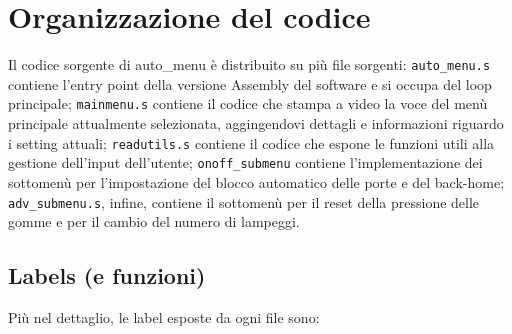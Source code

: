\documentclass[
  12pt,
  a4paper,
  headings=optiontoheadandtoc
]{scrreprt}
\begin{document}
\chapter[nonumber=true]{Organizzazione del codice}

Il codice sorgente di auto\_menu è distribuito su più file sorgenti: \texttt{auto\_menu.s} contiene l'entry point della versione Assembly del software e si occupa del loop principale; \texttt{mainmenu.s} contiene il codice che stampa a video la voce del menù principale attualmente selezionata, aggingendovi dettagli e informazioni riguardo i setting attuali; \texttt{readutils.s} contiene il codice che espone le funzioni utili alla gestione dell'input dell'utente; \texttt{onoff\_submenu} contiene l'implementazione dei sottomenù per l'impostazione del blocco automatico delle porte e del back-home; \texttt{adv\_submenu.s}, infine, contiene il sottomenù per il reset della pressione delle gomme e per il cambio del numero di lampeggi.

\section[nonumber=true]{Labels (e funzioni)}

Più nel dettaglio, le label esposte da ogni file sono:
\end{document}
